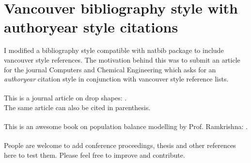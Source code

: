 \documentclass[a4paper,12pt,twoside]{report}
\begin{document}
\chapter*{Vancouver bibliography style with authoryear style citations}

I modified a bibliography style compatible with natbib package to include vancouver style references. 
The motivation behind this was to submit an article for the journal Computers and Chemical Engineering which asks for an \emph{authoryear} citation style in conjunction with vancouver style reference lists.
\\
\\
This is a journal article on drop shapes: \cite{bhutani2013determination}.
\\
The same article \citep{bhutani2013determination} can also be cited in parenthesis.
\\
\\
This is an awesome book on population balance modelling by Prof. Ramkrishna: \cite{ramkrishna2000population}.
\\
\\
People are welcome to add conference proceedings, thesis and other references here to test them.
Please feel free to improve and contribute.



\end{document}
